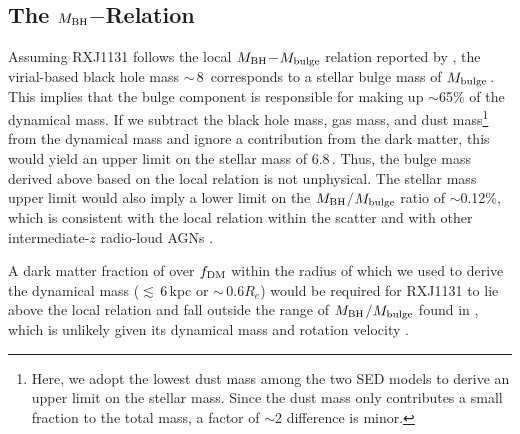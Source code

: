 \documentclass[]{emulateapj}
\begin{document}
\subsection{The $M_{\rm BH}$$-$\mdyn Relation}
Assuming RXJ1131 follows the local $M_{\rm BH}$$-$$M_{\rm bulge}$ relation reported by \citet{HR04a}, 
the virial-based black hole mass \mbh$\sim$\,8\,\Msun \citep{Sluse12a} corresponds 
to a stellar bulge mass of $M_{\rm bulge}$\,\Msun.
This implies that the bulge component is responsible for making up $\sim$65\% of the dynamical mass. 
If we subtract the black hole mass, gas mass, and dust mass\footnote{Here, we adopt the lowest dust mass among the two SED models to derive an upper limit on the stellar mass. Since the dust mass only contributes a small fraction to the total mass, a factor of $\sim$2 difference is minor.}
from the dynamical mass and ignore a contribution from the dark matter, this would
yield an upper limit on the stellar mass of 6.8\,\Msun. 
Thus, the bulge mass derived above based on the local relation is not unphysical.
The stellar mass upper limit would also imply a lower limit on the 
$M_{\rm BH}$$/$$M_{\rm bulge}$ ratio of $\sim$0.12\%, which is consistent with the local relation within the scatter and with other intermediate-$z$ radio-loud AGNs \citep{McLure06a}. 

A dark matter fraction of over $f_{\rm DM}$ within the radius of which we used to derive the 
dynamical mass (\ie $\lesssim$\,6\,kpc or $\sim$\,0.6$R_e$) would be required for RXJ1131 to 
lie above the local relation and fall outside the range of $M_{\rm BH}$$/$$M_{\rm bulge}$ found in 
\citet{McLure06a}, which is unlikely given its dynamical mass and rotation velocity 
\citep{Courteau15a}.
\end{document}
